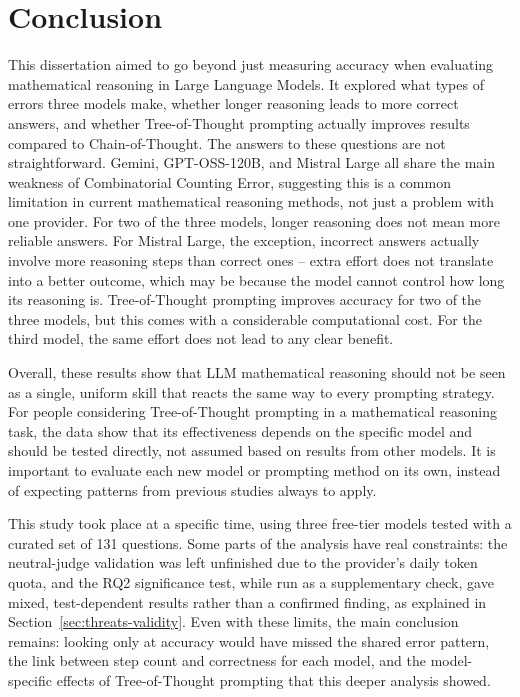 \chapter{Conclusion}
\label{chap:conclusion}

This dissertation aimed to go beyond just measuring accuracy when
evaluating mathematical reasoning in Large Language Models. It explored
what types of errors three models make, whether longer reasoning leads
to more correct answers, and whether Tree-of-Thought prompting actually
improves results compared to Chain-of-Thought. The answers to these
questions are not straightforward. Gemini, GPT-OSS-120B, and Mistral
Large all share the main weakness of Combinatorial Counting Error,
suggesting this is a common limitation in current mathematical reasoning
methods, not just a problem with one provider. For two of the three
models, longer reasoning does not mean more reliable answers. For
Mistral Large, the exception, incorrect answers actually involve more
reasoning steps than correct ones -- extra effort does not translate
into a better outcome, which may be because the model cannot control how
long its reasoning is. Tree-of-Thought prompting improves accuracy for
two of the three models, but this comes with a considerable
computational cost. For the third model, the same effort does not lead
to any clear benefit.

Overall, these results show that LLM mathematical reasoning should not
be seen as a single, uniform skill that reacts the same way to every
prompting strategy. For people considering Tree-of-Thought prompting in
a mathematical reasoning task, the data show that its effectiveness
depends on the specific model and should be tested directly, not assumed
based on results from other models. It is important to evaluate each new
model or prompting method on its own, instead of expecting patterns from
previous studies always to apply.

This study took place at a specific time, using three free-tier models
tested with a curated set of 131 questions. Some parts of the analysis
have real constraints: the neutral-judge validation was left unfinished
due to the provider's daily token quota, and the RQ2 significance test,
while run as a supplementary check, gave mixed, test-dependent results
rather than a confirmed finding, as explained in
Section~\ref{sec:threats-validity}. Even with these limits, the main
conclusion remains: looking only at
accuracy would have missed the shared error pattern, the link between
step count and correctness for each model, and the model-specific
effects of Tree-of-Thought prompting that this deeper analysis showed.
